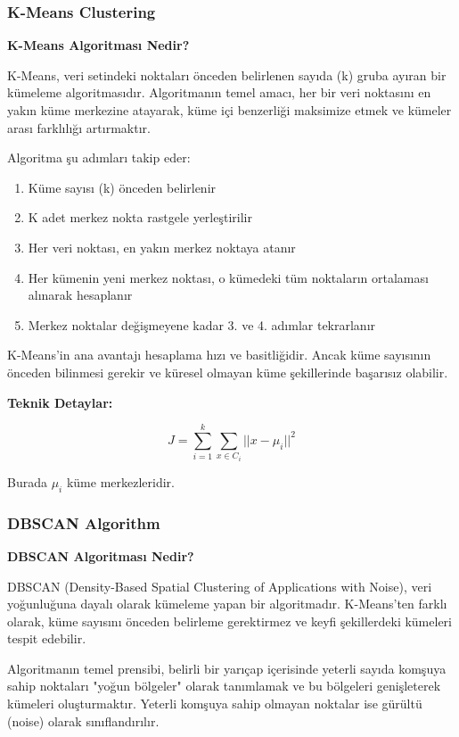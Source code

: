 \subsubsection{K-Means Clustering}

\textbf{K-Means Algoritması Nedir?}

K-Means, veri setindeki noktaları önceden belirlenen sayıda (k) gruba ayıran bir kümeleme algoritmasıdır. Algoritmanın temel amacı, her bir veri noktasını en yakın küme merkezine atayarak, küme içi benzerliği maksimize etmek ve kümeler arası farklılığı artırmaktır.

Algoritma şu adımları takip eder:
\begin{enumerate}
    \item Küme sayısı (k) önceden belirlenir
    \item K adet merkez nokta rastgele yerleştirilir
    \item Her veri noktası, en yakın merkez noktaya atanır
    \item Her kümenin yeni merkez noktası, o kümedeki tüm noktaların ortalaması alınarak hesaplanır
    \item Merkez noktalar değişmeyene kadar 3. ve 4. adımlar tekrarlanır
\end{enumerate}

K-Means'in ana avantajı hesaplama hızı ve basitliğidir. Ancak küme sayısının önceden bilinmesi gerekir ve küresel olmayan küme şekillerinde başarısız olabilir.

\textbf{Teknik Detaylar:}

\begin{equation}
J = \sum_{i=1}^{k} \sum_{x \in C_i} ||x - \mu_i||^2
\label{eq:kmeans_objective}
\end{equation}

Burada $\mu_i$ küme merkezleridir.

\newpage

\subsubsection{DBSCAN Algorithm}

\textbf{DBSCAN Algoritması Nedir?}

DBSCAN (Density-Based Spatial Clustering of Applications with Noise), veri yoğunluğuna dayalı olarak kümeleme yapan bir algoritmadır. K-Means'ten farklı olarak, küme sayısını önceden belirleme gerektirmez ve keyfi şekillerdeki kümeleri tespit edebilir.

Algoritmanın temel prensibi, belirli bir yarıçap içerisinde yeterli sayıda komşuya sahip noktaları "yoğun bölgeler" olarak tanımlamak ve bu bölgeleri genişleterek kümeleri oluşturmaktır. Yeterli komşuya sahip olmayan noktalar ise gürültü (noise) olarak sınıflandırılır.

